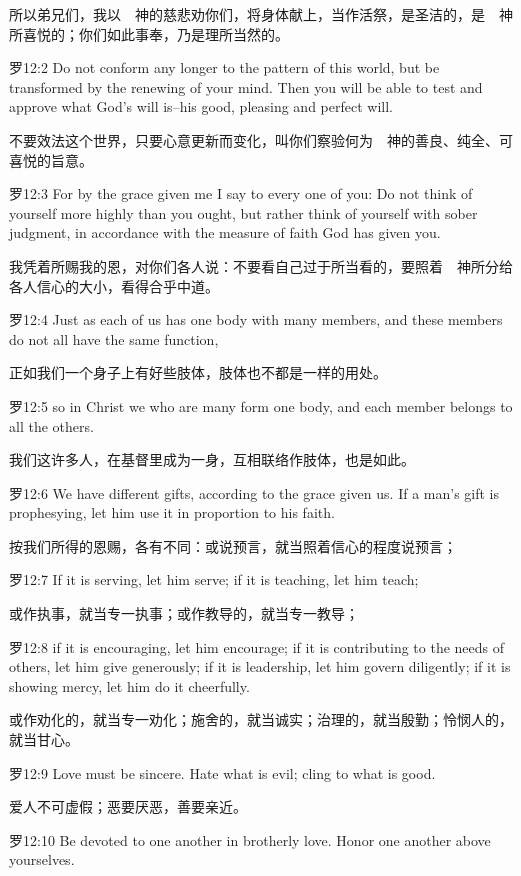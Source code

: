 \documentclass[a4paper,11pt,onecolumn,twoside]{ctexart}
\begin{document}
\begin{multicols}{2}
 所以弟兄们，我以　神的慈悲劝你们，将身体献上，当作活祭，是圣洁的，是　神所喜悦的；你们如此事奉，乃是理所当然的。


 罗12:2
 Do not conform any longer to the pattern of this world, but be transformed by the renewing of your mind. Then you will be able to test and approve what God's will is--his good, pleasing and perfect will.

 不要效法这个世界，只要心意更新而变化，叫你们察验何为　神的善良、纯全、可喜悦的旨意。


 罗12:3
 For by the grace given me I say to every one of you: Do not think of yourself more highly than you ought, but rather think of yourself with sober judgment, in accordance with the measure of faith God has given you.

 我凭着所赐我的恩，对你们各人说：不要看自己过于所当看的，要照着　神所分给各人信心的大小，看得合乎中道。


 罗12:4
 Just as each of us has one body with many members, and these members do not all have the same function,

 正如我们一个身子上有好些肢体，肢体也不都是一样的用处。


 罗12:5
 so in Christ we who are many form one body, and each member belongs to all the others.

 我们这许多人，在基督里成为一身，互相联络作肢体，也是如此。


 罗12:6
 We have different gifts, according to the grace given us. If a man's gift is prophesying, let him use it in proportion to his faith.

 按我们所得的恩赐，各有不同：或说预言，就当照着信心的程度说预言；


 罗12:7
 If it is serving, let him serve; if it is teaching, let him teach;

 或作执事，就当专一执事；或作教导的，就当专一教导；


 罗12:8
 if it is encouraging, let him encourage; if it is contributing to the needs of others, let him give generously; if it is leadership, let him govern diligently; if it is showing mercy, let him do it cheerfully.

 或作劝化的，就当专一劝化；施舍的，就当诚实；治理的，就当殷勤；怜悯人的，就当甘心。


 罗12:9
 Love must be sincere. Hate what is evil; cling to what is good.

 爱人不可虚假；恶要厌恶，善要亲近。


 罗12:10
 Be devoted to one another in brotherly love. Honor one another above yourselves.


\end{multicols}
\end{document}
